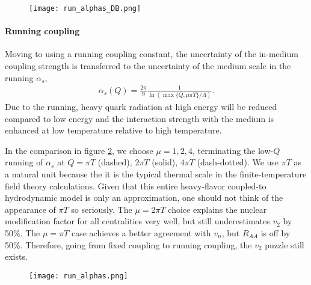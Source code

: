 \begin{figure}
\centering
\texttt{[image: run\_alphas\_DB.png]}
\caption{}
\label{fig:new:fix-DB}
\end{figure}

\paragraph{Running coupling} Moving to using a running coupling constant, the uncertainty of the in-medium coupling strength is transferred to the uncertainty of the medium scale in the running $\alpha_s$,
\begin{eqnarray}
\alpha_s(Q) = \frac{2\pi}{9}\frac{1}{\ln \left( \max\{Q, \mu\pi T\} / \Lambda\right)}.
\end{eqnarray}
Due to the running, heavy quark radiation at high energy will be reduced compared to low energy and the interaction strength with the medium is enhanced at low temperature relative to high temperature.

In the comparison in figure \ref{fig:new:run-a}, we choose $\mu = 1, 2, 4$, terminating the low-$Q$ running of $\alpha_s$ at $Q = \pi T$ (dashed), $2\pi T$ (solid), $4\pi T$ (dash-dotted).
We use $\pi T$ as a natural unit because the it is the typical thermal scale in the finite-temperature field theory calculations.
Given that this entire heavy-flavor coupled-to hydrodynamic model is only an approximation, one should not think of the appearance of $\pi T$ so seriously.
The $\mu=2\pi T$ choice explains the nuclear modification factor for all centralities very well, but still underestimates $v_2$ by 50\%.
The $\mu=\pi T$ case achieves a better agreement with $v_n$, but $R_{AA}$ is off by 50\%.
Therefore, going from fixed coupling to running coupling, the $v_2$ puzzle still exists.

\begin{figure}
\centering
\texttt{[image: run\_alphas.png]}
\caption{}
\label{fig:new:run-a}
\end{figure}

